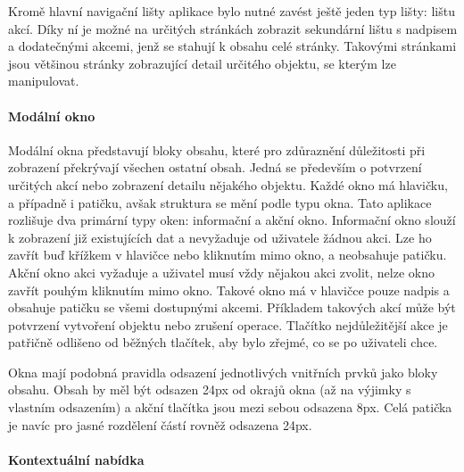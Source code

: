 			Kromě hlavní navigační lišty aplikace bylo nutné zavést ještě jeden typ lišty: lištu akcí.
			Díky ní je možné na určitých stránkách zobrazit sekundární lištu s nadpisem a dodatečnými akcemi, jenž se stahují
			k obsahu celé stránky.
			Takovými stránkami jsou většinou stránky zobrazující detail určitého objektu, se kterým lze manipulovat.


			\paragraph{Modální okno}

			Modální okna představují bloky obsahu, které pro zdůraznění
			důležitosti při zobrazení překrývají všechen ostatní obsah.
			Jedná se především o potvrzení určitých akcí nebo zobrazení detailu nějakého objektu.
			Každé okno má hlavičku, a případně i patičku, avšak struktura se mění podle typu okna.
			Tato aplikace rozlišuje dva primární typy oken: informační a akční okno.
			Informační okno slouží k zobrazení již existujících dat a nevyžaduje od uživatele žádnou akci.
			Lze ho zavřít buď křížkem v hlavičce nebo kliknutím mimo okno, a neobsahuje patičku.
			Akční okno akci vyžaduje a uživatel musí vždy nějakou akci zvolit, nelze okno zavřít pouhým kliknutím mimo okno.
			Takové okno má v hlavičce pouze nadpis a obsahuje patičku se všemi dostupnými akcemi.
			Příkladem takových akcí může být potvrzení vytvoření objektu nebo zrušení operace.
			Tlačítko nejdůležitější akce je patřičně odlišeno od běžných tlačítek, aby bylo zřejmé, co se po
			uživateli chce.

			Okna mají podobná pravidla odsazení jednotlivých vnitřních prvků jako bloky obsahu.
			Obsah by měl být odsazen 24px od okrajů okna (až na výjimky s vlastním odsazením) a akční tlačítka jsou
			mezi sebou odsazena 8px.
			Celá patička je navíc pro jasné rozdělení částí rovněž odsazena 24px.



			\newpage

			\paragraph{Kontextuální nabídka}


